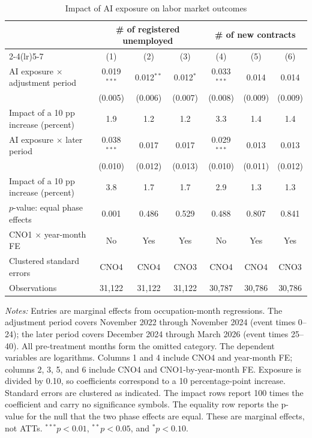 \begin{table}[!htbp]
\centering
\caption{Impact of AI exposure on labor market outcomes}
\label{tab:v1_main_effects}
\begin{threeparttable}
\scriptsize
\setlength{\tabcolsep}{3.5pt}
\begin{tabular}{lcccccc}
\toprule
& \multicolumn{3}{c}{\# of registered unemployed} & \multicolumn{3}{c}{\# of new contracts} \\
\cmidrule(lr){2-4}\cmidrule(lr){5-7}
& (1) & (2) & (3) & (4) & (5) & (6) \\
\midrule
AI exposure $\times$ adjustment period & 0.019$^{***}$ & 0.012$^{**}$ & 0.012$^{*}$ & 0.033$^{***}$ & 0.014 & 0.014 \\
 & (0.005) & (0.006) & (0.007) & (0.008) & (0.009) & (0.009) \\
Impact of a 10 pp increase (percent) & 1.9 & 1.2 & 1.2 & 3.3 & 1.4 & 1.4 \\
\addlinespace
AI exposure $\times$ later period & 0.038$^{***}$ & 0.017 & 0.017 & 0.029$^{***}$ & 0.013 & 0.013 \\
 & (0.010) & (0.012) & (0.013) & (0.010) & (0.011) & (0.012) \\
Impact of a 10 pp increase (percent) & 3.8 & 1.7 & 1.7 & 2.9 & 1.3 & 1.3 \\
$p$-value: equal phase effects & 0.001 & 0.486 & 0.529 & 0.488 & 0.807 & 0.841 \\
\midrule
CNO1 $\times$ year-month FE & No & Yes & Yes & No & Yes & Yes \\
Clustered standard errors & CNO4 & CNO4 & CNO3 & CNO4 & CNO4 & CNO3 \\
Observations & 31,122 & 31,122 & 31,122 & 30,787 & 30,786 & 30,786 \\
\bottomrule
\end{tabular}
\begin{tablenotes}[flushleft]
\footnotesize
\item \emph{Notes:} Entries are marginal effects from occupation-month regressions. The adjustment period covers November 2022 through November 2024 (event times 0--24); the later period covers December 2024 through March 2026 (event times 25--40). All pre-treatment months form the omitted category. The dependent variables are logarithms. Columns 1 and 4 include CNO4 and year-month FE; columns 2, 3, 5, and 6 include CNO4 and CNO1-by-year-month FE. Exposure is divided by 0.10, so coefficients correspond to a 10 percentage-point increase. Standard errors are clustered as indicated. The impact rows report 100 times the coefficient and carry no significance symbols. The equality row reports the p-value for the null that the two phase effects are equal. These are marginal effects, not ATTs. $^{***}p<0.01$, $^{**}p<0.05$, and $^{*}p<0.10$.
\end{tablenotes}
\end{threeparttable}
\end{table}
